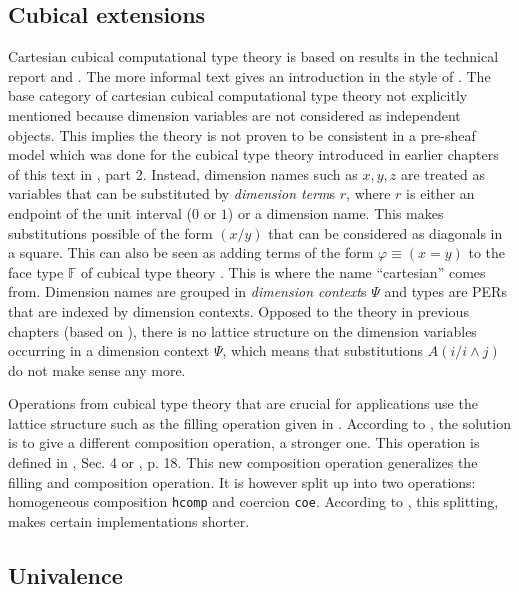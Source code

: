 \documentclass[12pt,a4paper,twoside,xetex]{book} %
\newcommand{\keyword}[1]{\emph{#1}\index{#1}}
\begin{document}
\subsection{Cubical extensions}\label{compcubes}

Cartesian cubical computational type theory is based on results in the technical 
report \cite{AnHoHa17} and \cite{Angiuli2018}. The more informal text 
\cite{Bentzen2018Jun} gives an introduction in the style of 
\cite{Voevodsky2013}. The base category of cartesian cubical computational type 
theory not explicitly mentioned because dimension variables are not considered 
as independent objects. This implies the theory is not proven to be consistent 
in a pre-sheaf model which was done for the cubical type theory introduced in 
earlier chapters of this text in \cite{Huber2016}, part 2. Instead, dimension 
names such as $x,y,z$ are treated as variables that can be substituted 
by \keyword{dimension term}s $r$, where $r$ is either an endpoint of the unit 
interval ($0$ or $1$) or a dimension name. This makes substitutions possible of 
the form $(x/y)$ that can be considered as diagonals in a square. This can also 
be seen as adding terms of the form $\varphi \equiv (x = y)$ to the face type 
$\mathbb{F}$ of cubical type theory \cite{Huber2016}. This is where the name 
``cartesian'' comes from. Dimension names are grouped in \keyword{dimension 
context}s $\Psi$ and types are PERs that are indexed by dimension contexts. 
Opposed to the theory in previous chapters (based on \cite{Huber2016}), there is 
no lattice structure on the dimension variables occurring in a dimension context 
$\Psi$, which means that substitutions  $A(i/i\wedge j)$ do not make sense 
any more.

Operations from cubical type theory that are crucial for applications use the 
lattice structure such as the filling operation given in . 
According to \cite{Moertberg2018Bonn}, the solution is to give a different 
composition operation, a stronger one. This operation is defined in 
\cite{Angiuli2018}, Sec. 4 or \cite{Moertberg2018Bonn}, p. 18. This new 
composition operation generalizes the filling and composition operation. It is 
however split up into two operations: homogeneous composition \texttt{hcomp} and 
coercion \texttt{coe}. According to \cite{Moertberg2018Bonn}, this splitting, 
makes certain implementations shorter.

\subsection{Univalence}\label{compuniv}
\end{document}
